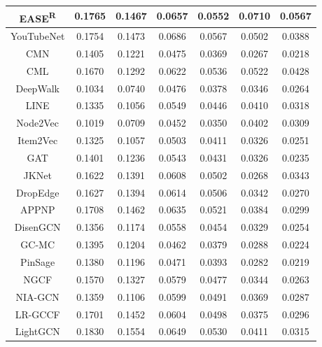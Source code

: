 \documentclass[sigconf,natbib=true]{acmart}
\begin{document}
\begin{table}[ht!]
\begin{tabular}{c cc cc cc}
        EASE\textsuperscript{R}              & 0.1765	& 0.1467           & 0.0657	& 0.0552  & 0.0710 & 0.0567 \\\midrule
        YouTubeNet              & 0.1754 & 0.1473           & 0.0686 & 0.0567  & 0.0502 & 0.0388 \\
        CMN                     & 0.1405 & 0.1221           & 0.0475 & 0.0369  & 0.0267 & 0.0218 \\
        CML                     & 0.1670 & 0.1292           & 0.0622 & 0.0536  & 0.0522 & 0.0428 \\\midrule
        DeepWalk                & 0.1034 & 0.0740           & 0.0476 & 0.0378  & 0.0346 & 0.0264 \\
        LINE                    & 0.1335 & 0.1056           & 0.0549 & 0.0446  & 0.0410 & 0.0318 \\
        Node2Vec                & 0.1019 & 0.0709           & 0.0452 & 0.0350  & 0.0402 & 0.0309 \\
        Item2Vec                & 0.1325 & 0.1057           & 0.0503 & 0.0411  & 0.0326 & 0.0251 \\\midrule
        GAT                     & 0.1401 & 0.1236           & 0.0543 & 0.0431  & 0.0326 & 0.0235 \\
        JKNet                   & 0.1622 & 0.1391           & 0.0608 & 0.0502  & 0.0268 & 0.0343 \\
        DropEdge                & 0.1627 & 0.1394           & 0.0614 & 0.0506  & 0.0342 & 0.0270 \\
        APPNP                   & 0.1708 & 0.1462           & 0.0635 & 0.0521  & 0.0384 & 0.0299 \\
        DisenGCN                & 0.1356 & 0.1174           & 0.0558 & 0.0454  & 0.0329 & 0.0254 \\\midrule
        GC-MC                   & 0.1395 & 0.1204           & 0.0462 & 0.0379  & 0.0288 & 0.0224 \\
        PinSage                 & 0.1380 & 0.1196           & 0.0471 & 0.0393  & 0.0282 & 0.0219 \\
        NGCF                    & 0.1570 & 0.1327           & 0.0579 & 0.0477  & 0.0344 & 0.0263 \\
        NIA-GCN                 & 0.1359 & 0.1106           & 0.0599 & 0.0491  & 0.0369 & 0.0287 \\
        LR-GCCF                 & 0.1701 & 0.1452           & 0.0604 & 0.0498  & 0.0375 & 0.0296 \\
        LightGCN                & 0.1830 & 0.1554           & 0.0649 & 0.0530  & 0.0411 & 0.0315 \\

\end{tabular}
\end{table}
\end{document}
